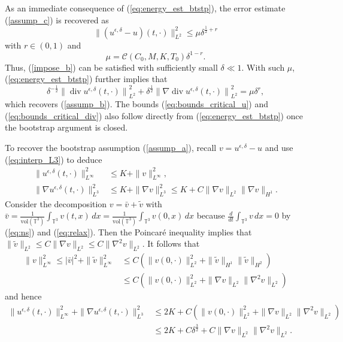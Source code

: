 \documentclass[reqno,10pt]{amsart}
\theoremstyle{definition}
\theoremstyle{remark}
\numberwithin{equation}{section}
\DeclareMathOperator{\dive}{div}
\begin{document}
As an immediate consequence of (\ref{eq:energy_est_btstp}), the error estimate (\ref{assump_c}) is recovered as
\[
    \| (u^{\epsilon,\delta}-u)(t,\cdot)\|_{L^2}^2 \le \mu \delta^{\frac{1}{2}+r}
\]
with $r\in(0,1)$ and
\[
    \mu = \mathcal C(C_0,M,K,T_0)\delta^{1-r}.
\]
Thus, (\ref{impose_b}) can be satisfied with sufficiently small $\delta\ll 1$. With such $\mu$, (\ref{eq:energy_est_btstp}) further implies that
\[
    \delta^{-\frac{1}{2}} {\|\dive u^{\epsilon,\delta}(t,\cdot)\|}_{L^2}^2 + \delta^{\frac{1}{2}}{ \|\nabla \dive u^{\epsilon,\delta}(t,\cdot)\|}_{L^2}^2 = \mu \delta^r,
\]
which recovers (\ref{assump_b}). The bounds (\ref{eq:bounds_critical_u}) and (\ref{eq:bounds_critical_div}) also follow directly from (\ref{eq:energy_est_btstp}) once the bootstrap argument is closed.

To recover the bootstrap assumption (\ref{assump_a}), recall $v=u^{\epsilon,\delta}-u$ and use (\ref{eq:interp_L3}) to deduce
\[
\begin{aligned}
    \|u^{\epsilon,\delta}(t,\cdot)\|_{L^\infty}^2 
    &\le K + \|v\|_{L^\infty}^2, \\
    \|\nabla u^{\epsilon,\delta}(t,\cdot)\|_{L^3}^2 &\le K + \|\nabla v\|_{L^3}^2 
    \le K + C \|\nabla v\|_{L^2} \|\nabla v\|_{H^1}.
\end{aligned}
\]
Consider the decomposition  $v=\bar v + \tilde v$ with $\bar v=\frac{1}{\text{vol}(\mathbb T^3)}\int_{\mathbb T^3} v(t,x) \,dx  = \frac{1}{\text{vol}(\mathbb T^3)}\int_{\mathbb T^3} v(0,x) \,dx$ because $\frac{d}{dt}\int_{\mathbb T^3} v \,dx=0$ by (\ref{eq:ns}) and (\ref{eq:relax}).
Then the Poincar{\'e} inequality implies that $\|\tilde v\|_{L^2}\le C\|\nabla v\|_{L^2} \le  C\|\nabla^2 v\|_{L^2}$. It follows that
\[
\begin{aligned}
    \|v\|_{L^\infty}^2 \le |\bar v|^2 + \|\tilde v\|_{L^\infty}^2
    &\le  C \left( \|v(0,\cdot)\|_{L^2}^2 + \|\tilde v\|_{H^1} \|\tilde v\|_{H^2} \right) \\
    &\le C \left( \|v(0,\cdot)\|_{L^2}^2 + \|\nabla v\|_{L^2} \|\nabla^2 v\|_{L^2} \right)
\end{aligned}
\]
and hence
\[
\begin{aligned}
    \|u^{\epsilon,\delta}(t,\cdot)\|_{L^\infty}^2 + \|\nabla u^{\epsilon,\delta}(t,\cdot)\|_{L^3}^2 
    &\le 2K + C \left( \|v(0,\cdot)\|_{L^2}^2 + \|\nabla v\|_{L^2} \|\nabla^2 v\|_{L^2} \right) \\
    &\le 2K+ C\delta^{\frac{3}{2}} + C\|\nabla v\|_{L^2} \|\nabla^2 v\|_{L^2}.
\end{aligned}
\]
\end{document}
